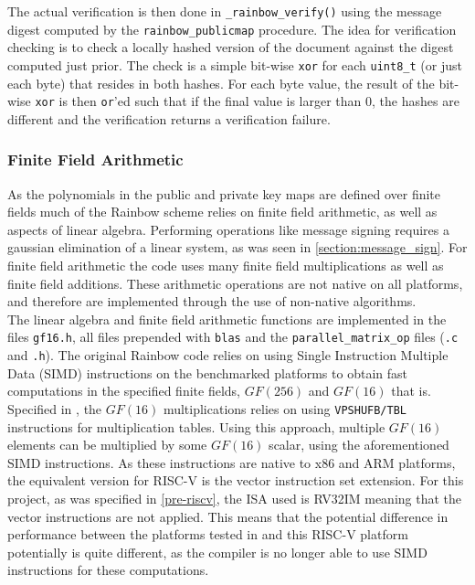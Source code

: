 The actual verification is then done in \texttt{\_rainbow\_verify()} using the message digest computed by the \texttt{rainbow\_publicmap} procedure. The idea for verification checking is to check a locally hashed version of the document against the digest computed just prior. The check is a simple bit-wise \texttt{xor} for each \texttt{uint8\_t} (or just each byte) that resides in both hashes. For each byte value, the result of the bit-wise \texttt{xor} is then \texttt{or}'ed such that if the final value is larger than 0, the hashes are different and the verification returns a verification failure.

\subsubsection{Finite Field Arithmetic} \label{implementation:ffa}
As the polynomials in the public and private key maps are defined over finite fields much of the Rainbow scheme relies on finite field arithmetic, as well as aspects of linear algebra. Performing operations like message signing requires a gaussian elimination of a linear system, as was seen in \cref{section:message_sign}. For finite field arithmetic the code uses many finite field multiplications as well as finite field additions. These arithmetic operations are not native on all platforms, and therefore are implemented through the use of non-native algorithms.\medskip\\
The linear algebra and finite field arithmetic functions are implemented in the files \texttt{gf16.h}, all files prepended with \texttt{blas} and the \texttt{parallel\_matrix\_op} files (\texttt{.c} and \texttt{.h}). The original Rainbow code relies on using Single Instruction Multiple Data (SIMD) instructions on the benchmarked platforms to obtain fast computations in the specified finite fields, $GF(256)$ and $GF(16)$ that is.
\medskip\\
Specified in \cite{rainbownist}, the $GF(16)$ multiplications relies on using \texttt{VPSHUFB/TBL} instructions for multiplication tables. Using this approach, multiple $GF(16)$ elements can be multiplied by some $GF(16)$ scalar, using the aforementioned SIMD instructions. As these instructions are native to x86 and ARM platforms, the equivalent version for RISC-V is the vector instruction set extension. For this project, as was specified in \cref{pre-riscv}, the ISA used is RV32IM meaning that the vector instructions are not applied. This means that the potential difference in performance between the platforms tested in \cite{rainbownist} and this RISC-V platform potentially is quite different, as the compiler is no longer able to use SIMD instructions for these computations.
